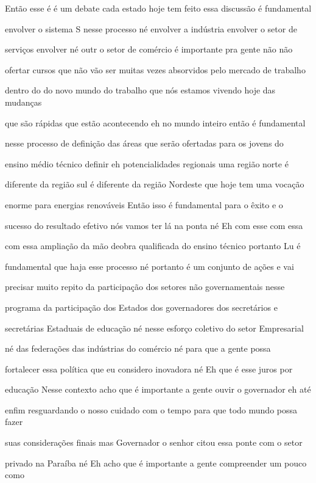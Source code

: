 \documentclass[a4paper,12pt]{article}
\begin{document}
Então esse é é um debate cada estado hoje tem feito essa discussão é fundamental

envolver o sistema S nesse processo né envolver a indústria envolver o setor de

serviços envolver né outr o setor de comércio é importante pra gente não não

ofertar cursos que não vão ser muitas vezes absorvidos pelo mercado de trabalho

dentro do do novo mundo do trabalho que nós estamos vivendo hoje das mudanças

que são rápidas que estão acontecendo eh no mundo inteiro então é fundamental

nesse processo de definição das áreas que serão ofertadas para os jovens do

ensino médio técnico definir eh potencialidades regionais uma região norte é

diferente da região sul é diferente da região Nordeste que hoje tem uma vocação

enorme para energias renováveis Então isso é fundamental para o êxito e o

sucesso do resultado efetivo nós vamos ter lá na ponta né Eh com esse com essa

com essa ampliação da mão deobra qualificada do ensino técnico portanto Lu é

fundamental que haja esse processo né portanto é um conjunto de ações e vai

precisar muito repito da participação dos setores não governamentais nesse

programa da participação dos Estados dos governadores dos secretários e

secretárias Estaduais de educação né nesse esforço coletivo do setor Empresarial

né das federações das indústrias do comércio né para que a gente possa

fortalecer essa política que eu considero inovadora né Eh que é esse juros por

educação Nesse contexto acho que é importante a gente ouvir o governador eh até

enfim resguardando o nosso cuidado com o tempo para que todo mundo possa fazer

suas considerações finais mas Governador o senhor citou essa ponte com o setor

privado na Paraíba né Eh acho que é importante a gente compreender um pouco como
\end{document}
